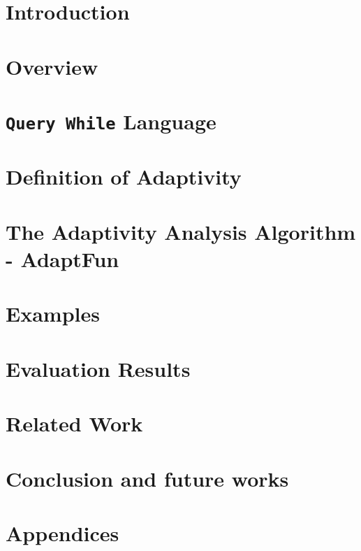 \documentclass[a4paper,11pt]{article}
\newcommand{\THESYSTEM}{\textsf{AdaptFun}}
\begin{document}
%
\tableofcontents


\section{Introduction}
\label{sec:intro}

\section{Overview}
\label{sec:overview}

\clearpage

\section{{\tt Query While} Language}
\label{sec:language}

\clearpage
% 
% 
\section{Definition of Adaptivity}
\label{sec:adaptivity}

\clearpage
\section{The Adaptivity Analysis Algorithm - {\THESYSTEM}}
\label{sec:algorithm}


\section{Examples}
\label{sec:examples}


\section{Evaluation Results}



\section{Related Work}

\section{Conclusion and future works}


%
\clearpage
\appendix
{}
\section*{Appendices}



\end{document}
